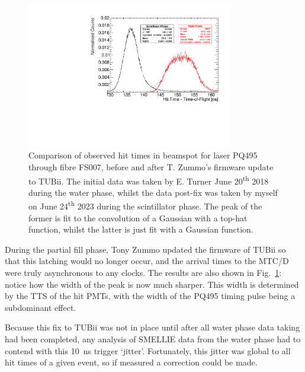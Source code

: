 \begin{figure}
    \centering
    \includegraphics[width=0.8\textwidth]{3_SMELLIEHardware/images/time_plots_comparison_114018_vs_302634_FS007_nice.pdf}
    \caption[Comparison of observed hit times in beamspot before and after TUBii firmware update]
    {Comparison of observed hit times in beamspot for laser PQ495 through fibre FS007, before and after T. Zummo's firmware update to TUBii. The initial data was taken by E. Turner June 20\textsuperscript{th} 2018 during the water phase, whilst the data post-fix was taken by myself on June 24\textsuperscript{th} 2023 during the scintillator phase. The peak of the former is fit to the convolution of a Gaussian with a top-hat function, whilst the latter is just fit with a Gaussian function.}
    \label{fig:smellie_beam_tres_tubii_comparison}
\end{figure}

During the partial fill phase, Tony Zummo updated the firmware of TUBii so that this latching would no longer occur, and the arrival times to the MTC/D were truly asynchronous to any clocks. The results are also shown in Fig.~\ref{fig:smellie_beam_tres_tubii_comparison}: notice how the width of the peak is now much sharper. This width is determined by the TTS of the hit PMTs, with the width of the PQ495 timing pulse being a subdominant effect.

Because this fix to TUBii was not in place until after all water phase data taking had been completed, any analysis of SMELLIE data from the water phase had to contend with this \SI{10}{\ns} trigger `jitter'. Fortunately, this jitter was global to all hit times of a given event, so if measured a correction could be made.

